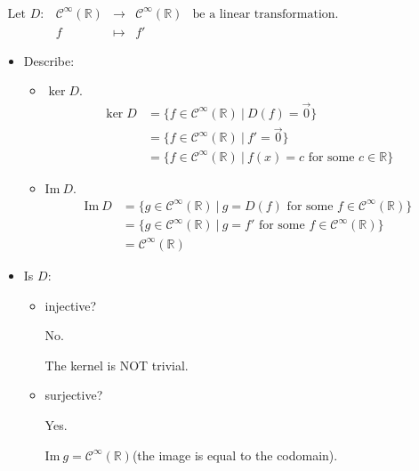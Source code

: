 \documentclass[11pt,fleqn]{book} %
\begin{document}
\begin{example}

    $\begin{matrix} \text{Let } D: &\mathcal{C}^\infty(\mathbb{R}) &\to &\mathcal{C}^\infty(\mathbb{R}) &\text{be a linear transformation.} \\ &f &\mapsto &f' \end{matrix}$

    \begin{itemize}
        \item Describe:

        \begin{itemize}
            \item $\ker D$.
            \begin{align*}
                \ker D
                &= \{f\in \mathcal{C}^\infty(\mathbb{R}) ~|~D(f) = \vec{0} \}
                \\
                &= \{ f \in \mathcal{C}^\infty(\mathbb{R}) ~|~f'=\vec{0} \}
                \\
                &=\{ f \in \mathcal{C}^\infty(\mathbb{R}) ~|~ f(x) = c \text{ for some } c \in \mathbb{R}\}
            \end{align*}

            \item $\mathrm{Im}~D$.
            \begin{align*}
                \mathrm{Im}~D
                &=\{ g \in \mathcal{C}^\infty(\mathbb{R}) ~|~g=D(f) \text{ for some }f \in \mathcal{C}^\infty(\mathbb{R}) \}
                \\
                &=\{ g \in \mathcal{C}^\infty(\mathbb{R}) ~|~ g = f' \text{ for some } f \in \mathcal{C}^\infty(\mathbb{R}) \}
                \\
                &= \mathcal{C}^\infty(\mathbb{R})
            \end{align*}
        \end{itemize}

        \item Is $D$:

        \begin{itemize}
            \item injective?

            No.

            The kernel is NOT trivial.
            \item surjective?

            Yes.

            $\mathrm{Im}~g=\mathcal{C}^\infty(\mathbb{R})$(the image is equal to the codomain).
        \end{itemize}
    \end{itemize}
\end{example}
\end{document}
